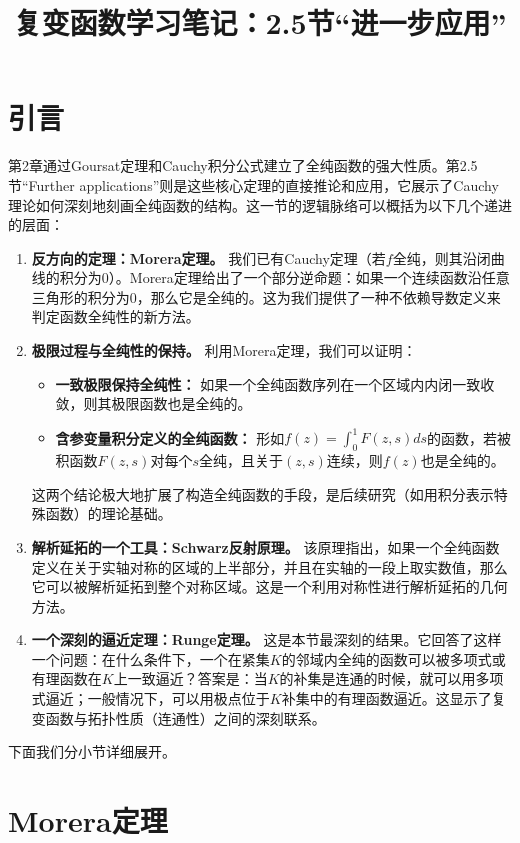 \documentclass[UTF8]{ctexart}
\title{复变函数学习笔记：2.5节“进一步应用”}
\date{}
\numberwithin{equation}{section}
\begin{document}
\maketitle

\section*{引言}

第2章通过Goursat定理和Cauchy积分公式建立了全纯函数的强大性质。第2.5节“Further applications”则是这些核心定理的直接推论和应用，它展示了Cauchy理论如何深刻地刻画全纯函数的结构。这一节的逻辑脉络可以概括为以下几个递进的层面：

\begin{enumerate}
    \item \textbf{反方向的定理：Morera定理。} 我们已有Cauchy定理（若$f$全纯，则其沿闭曲线的积分为0）。Morera定理给出了一个部分逆命题：如果一个连续函数沿任意三角形的积分为0，那么它是全纯的。这为我们提供了一种不依赖导数定义来判定函数全纯性的新方法。
    \item \textbf{极限过程与全纯性的保持。} 利用Morera定理，我们可以证明：
        \begin{itemize}
            \item \textbf{一致极限保持全纯性：} 如果一个全纯函数序列在一个区域内内闭一致收敛，则其极限函数也是全纯的。
            \item \textbf{含参变量积分定义的全纯函数：} 形如$f(z)=\int_0^1 F(z,s)ds$的函数，若被积函数$F(z,s)$对每个$s$全纯，且关于$(z,s)$连续，则$f(z)$也是全纯的。
        \end{itemize}
        这两个结论极大地扩展了构造全纯函数的手段，是后续研究（如用积分表示特殊函数）的理论基础。
    \item \textbf{解析延拓的一个工具：Schwarz反射原理。} 该原理指出，如果一个全纯函数定义在关于实轴对称的区域的上半部分，并且在实轴的一段上取实数值，那么它可以被解析延拓到整个对称区域。这是一个利用对称性进行解析延拓的几何方法。
    \item \textbf{一个深刻的逼近定理：Runge定理。} 这是本节最深刻的结果。它回答了这样一个问题：在什么条件下，一个在紧集$K$的邻域内全纯的函数可以被多项式或有理函数在$K$上一致逼近？答案是：当$K$的补集是连通的时候，就可以用多项式逼近；一般情况下，可以用极点位于$K$补集中的有理函数逼近。这显示了复变函数与拓扑性质（连通性）之间的深刻联系。
\end{enumerate}

下面我们分小节详细展开。

\section{Morera定理}
\end{document}
